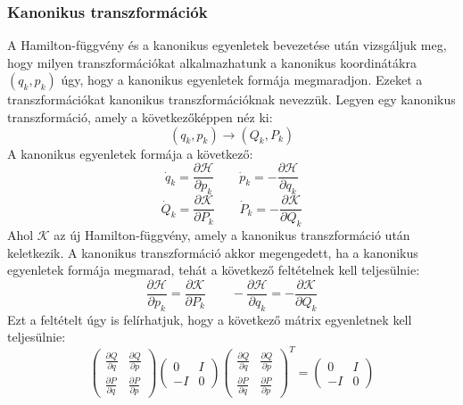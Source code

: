 \documentclass[a4paper,12pt]{article}
\begin{document}
\subsubsection{Kanonikus transzformációk}
A Hamilton-függvény és a kanonikus egyenletek bevezetése után vizsgáljuk meg, hogy milyen transzformációkat alkalmazhatunk a kanonikus koordinátákra $(q_k, p_k)$ úgy, hogy a kanonikus egyenletek formája megmaradjon.
Ezeket a transzformációkat kanonikus transzformációknak nevezzük. Legyen egy kanonikus transzformáció, amely a következőképpen néz ki:
\begin{equation}
    (q_k, p_k) \to (Q_k, P_k)
\end{equation}
A kanonikus egyenletek formája a következő:
\begin{equation}
    \dot{q}_k = \frac{\partial \mathcal{H}}{\partial p_k} \quad \quad \dot{p}_k = -\frac{\partial \mathcal{H}}{\partial q_k}
\end{equation}
\begin{equation}
    \dot{Q}_k = \frac{\partial \mathcal{K}}{\partial P_k} \quad \quad \dot{P}_k = -\frac{\partial \mathcal{K}}{\partial Q_k}
\end{equation}
Ahol $\mathcal{K}$ az új Hamilton-függvény, amely a kanonikus transzformáció után keletkezik. A kanonikus transzformáció akkor megengedett, ha a kanonikus egyenletek formája megmarad, tehát a következő feltételnek kell teljesülnie:
\begin{equation}
    \frac{\partial \mathcal{H}}{\partial p_k} = \frac{\partial \mathcal{K}}{\partial P_k} \quad \quad -\frac{\partial \mathcal{H}}{\partial q_k} = -\frac{\partial \mathcal{K}}{\partial Q_k}
\end{equation}
Ezt a feltételt úgy is felírhatjuk, hogy a következő mátrix egyenletnek kell teljesülnie:
\begin{equation}
    \begin{pmatrix}\frac{\partial Q}{\partial q} & \frac{\partial Q}{\partial p} \\ \frac{\partial P}{\partial q} & \frac{\partial P}{\partial p} \end{pmatrix}
    \begin{pmatrix} 0 & I \\ -I & 0 \end{pmatrix}
    \begin{pmatrix}\frac{\partial Q}{\partial q} & \frac{\partial Q}{\partial p} \\ \frac{\partial P}{\partial q} & \frac{\partial P}{\partial p} \end{pmatrix}^T
    = \begin{pmatrix} 0 & I \\ -I & 0 \end{pmatrix}
\end{equation}
\end{document}
